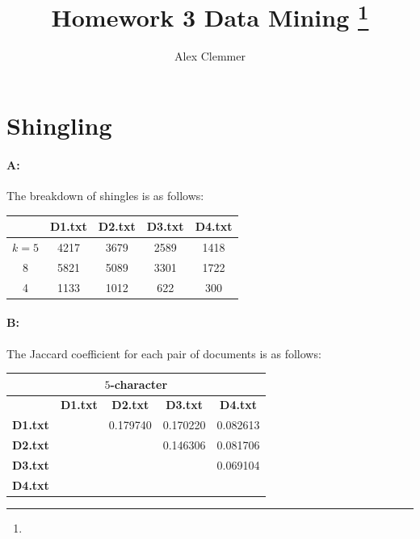 \documentclass[11pt]{article}
\title{Homework 3 Data Mining
\footnote{\s{CS 6955 Data Mining; \;\; Spring 2012 \hfill
Instructor: Jeff M. Phillips, University of Utah}
}
}
\author{Alex Clemmer}
\begin{document}
\maketitle






\section{Shingling}

\paragraph*{A:} The breakdown of shingles is as follows:

\begin{center}

\begin{tabular}{| c || c | c | c | c |}
\hline
& \textbf{D1.txt} & \textbf{D2.txt}  & \textbf{D3.txt}  & \textbf{D4.txt} \\
\hline
\hline
$k = 5$ & 4217 & 3679 & 2589 & 1418 \\
\hline
8 & 5821 & 5089 & 3301 & 1722 \\
\hline
4 & 1133 & 1012 & 622 & 300 \\
\hline

\end{tabular}

\end{center}


\paragraph*{B:} The Jaccard coefficient for each pair of documents is as follows:

\begin{center}

\begin{tabular}{| c || c | c | c | c |}
\hline
\multicolumn{5}{|c|}{$5$-character} \\
\hline
& \textbf{D1.txt} & \textbf{D2.txt}  & \textbf{D3.txt}  & \textbf{D4.txt} \\
\hline
\hline
\textbf{D1.txt} &  & 0.179740 & 0.170220 & 0.082613 \\
\hline
\textbf{D2.txt} &  & & 0.146306 & 0.081706 \\
\hline
\textbf{D3.txt} &  &  &  & 0.069104 \\
\hline
\textbf{D4.txt} &  &  &  &  \\
\hline
\end{tabular}

\end{center}
\end{document}
